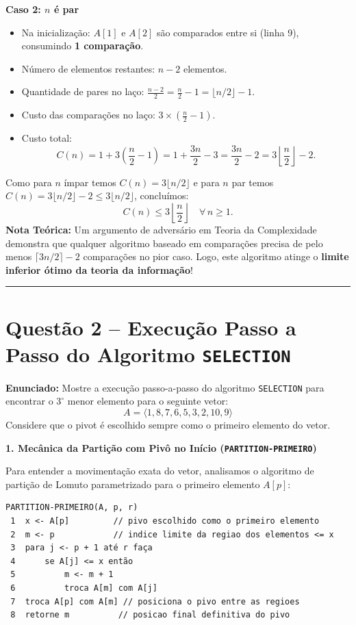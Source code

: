 \documentclass[11pt,a4paper]{article}
\newcommand{\topico}[1]{\par\medskip\textbf{\color{azul}#1}\par}
\newcommand{\questao}[2]{\section*{Questão #1 -- #2}}
\newcommand{\destaque}[1]{\textbf{\color{azul}#1}}
\begin{document}
\textbf{Caso 2: $n$ é par}
\begin{itemize}
    \item Na inicialização: $A[1]$ e $A[2]$ são comparados entre si (linha 9), consumindo \destaque{1 comparação}.
    \item Número de elementos restantes: $n - 2$ elementos.
    \item Quantidade de pares no laço: $\frac{n - 2}{2} = \frac{n}{2} - 1 = \lfloor n/2 \rfloor - 1$.
    \item Custo das comparações no laço: $3 \times \left(\frac{n}{2} - 1\right)$.
    \item Custo total:
    \[
    C(n) = 1 + 3\left(\frac{n}{2} - 1\right) = 1 + \frac{3n}{2} - 3 = \frac{3n}{2} - 2 = 3\left\lfloor \frac{n}{2} \right\rfloor - 2.
    \]
\end{itemize}

\begin{caixaEstudo}
Como para $n$ ímpar temos $C(n) = 3\lfloor n/2 \rfloor$ e para $n$ par temos $C(n) = 3\lfloor n/2 \rfloor - 2 \le 3\lfloor n/2 \rfloor$, concluímos:
\[
\boxed{C(n) \le 3\left\lfloor \frac{n}{2} \right\rfloor \quad \forall\, n \ge 1.}
\]
\textbf{Nota Teórica:} Um argumento de adversário em Teoria da Complexidade demonstra que qualquer algoritmo baseado em comparações precisa de pelo menos $\lceil 3n/2 \rceil - 2$ comparações no pior caso. Logo, este algoritmo atinge o \textbf{limite inferior ótimo da teoria da informação}!
\end{caixaEstudo}

\vspace{10pt}
\hrule
\vspace{6pt}

\questao{2}{Execução Passo a Passo do Algoritmo \texttt{SELECTION}}

\textbf{Enunciado:} Mostre a execução passo-a-passo do algoritmo \texttt{SELECTION} para encontrar o $3^\circ$ menor elemento para o seguinte vetor:
\[
A = \langle 1, 8, 7, 6, 5, 3, 2, 10, 9 \rangle
\]
Considere que o pivot é escolhido sempre como o primeiro elemento do vetor.

\topico{1. Mecânica da Partição com Pivô no Início (\texttt{PARTITION-PRIMEIRO})}
Para entender a movimentação exata do vetor, analisamos o algoritmo de partição de Lomuto parametrizado para o primeiro elemento $A[p]$:
\begin{lstlisting}
PARTITION-PRIMEIRO(A, p, r)
 1  x <- A[p]         // pivo escolhido como o primeiro elemento
 2  m <- p            // indice limite da regiao dos elementos <= x
 3  para j <- p + 1 até r faça
 4      se A[j] <= x então
 5          m <- m + 1
 6          troca A[m] com A[j]
 7  troca A[p] com A[m] // posiciona o pivo entre as regioes
 8  retorne m          // posicao final definitiva do pivo
\end{lstlisting}
\end{document}
